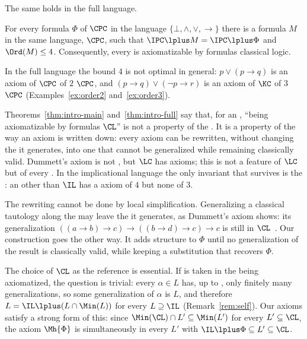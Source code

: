 The same holds in the full language.

\begin{theorem}\label{thm:intro-full}
For every formula $\Phi$ of $\CPC$ in the language
$\{\bot,\wedge,\vee,\to\}$ there is a formula $M$ in the same language,
 $\CPC$, such that $\IPC\lplus M=\IPC\lplus\Phi$ and
$\Ord(M)\le4$. Consequently, every  is axiomatizable
by formulas  classical logic.
\end{theorem}

In the full language the bound $4$ is not optimal in general:
$p\vee(p\to q)$ is an axiom of $\CPC$ of  $2$ 
$\CPC$, and $(p\to q)\vee(\neg p\to r)$ is an axiom of $\KC$ of 
$3$  $\CPC$ (Examples~\ref{ex:order2} and~\ref{ex:order3}).

Theorems~\ref{thm:intro-main} and~\ref{thm:intro-full} say that, for an
, ``being axiomatizable by formulas 
$\CL$'' is not a property of the . It is a property of the way an
axiom is written down: every axiom can be rewritten, without changing the
 it generates, into one that cannot be generalized while
remaining classically valid. Dummett's axiom is not , but $\LC$
has  axioms; this is not a feature of $\LC$ but of every
. In the implicational language the only invariant
that survives is the : an  other than $\IL$
has a  axiom of  $4$ but none of  $3$.

The rewriting cannot be done by local simplification. Generalizing a
classical tautology along the  may leave the
 it generates, as Dummett's axiom shows: its generalization
$((a\to b)\to c)\to((b\to d)\to c)\to c$ is still in
$\CL$~\cite[Example~2.4]{NM21}. Our construction goes the other way. It adds
structure to $\Phi$ until no generalization of the result is classically
valid, while keeping a substitution that recovers $\Phi$.

The choice of $\CL$ as the reference  is essential. If
 is taken in the  being axiomatized, the question
is trivial: every $\alpha\in L$ has, up to , only finitely
many generalizations, so some generalization of $\alpha$ is 
$L$, and therefore $L=\IL\lplus(L\cap\Min(L))$ for every 
$L\supseteq\IL$ (Remark~\ref{rem:self}). Our axioms satisfy a strong form
of this: since $\Min(\CL)\cap L'\subseteq\Min(L')$ for every
$L'\subseteq\CL$, the axiom $\Mh{\Phi}$ is  simultaneously in
every  $L'$ with $\IL\lplus\Phi\subseteq L'\subseteq\CL$.

